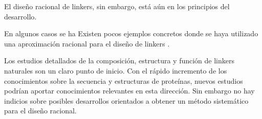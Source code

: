 








El diseño racional de linkers, sin embargo, está aún en los principios del desarrollo. 



En algunos casos se ha 
Existen pocos ejemplos concretos donde se haya utilizado una aproximación racional para el diseño de linkers \cite{arai2001design,arai2004conformations}.

Los estudios detallados de la composición, estructura y función de linkers naturales son un claro punto de inicio.
Con el rápido incremento de los conocimientos sobre la secuencia y estructuras de proteínas, nuevos estudios podrían aportar conocimientos relevantes en esta dirección.
Sin embargo no hay indicios sobre posibles desarrollos orientados a obtener un método sistemático para el diseño racional.  

